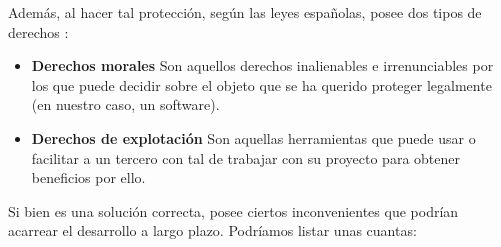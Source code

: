 Además, al hacer tal protección, según las leyes españolas, posee dos tipos de derechos \cite{propint-1996}:

\begin{itemize}
	\item \textbf{Derechos morales} Son aquellos derechos inalienables e irrenunciables por los que puede decidir sobre el objeto que se ha querido proteger legalmente (en nuestro caso, un software).
	
	\item \textbf{Derechos de explotación} Son aquellas herramientas que puede usar o facilitar a un tercero con tal de trabajar con su proyecto para obtener beneficios por ello.
\end{itemize}

Si bien es una solución correcta, posee ciertos inconvenientes que podrían acarrear el desarrollo a largo plazo. Podríamos listar unas cuantas:

